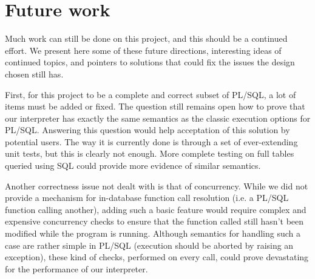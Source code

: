 \documentclass[twoside,11pt,a4paper]{article}
\newcommand{\startsection}[1]{
	\cleardoublepage
	\section{#1}
	\thispagestyle{basic}
}
\begin{document}
%

\startsection{Future work}
\label{sec:futurework}


Much work can still be done on this project, and this should be a continued effort. We present here some of these future directions, interesting ideas of continued topics, and pointers to solutions that could fix the issues the design chosen still has.

First, for this project to be a complete and correct subset of PL/SQL, a lot of items must be added or fixed. The question still remains open how to prove that our interpreter has exactly the same semantics as the classic execution options for PL/SQL. Answering this question would help acceptation of this solution by potential users. The way it is currently done is through a set of ever-extending unit tests, but this is clearly not enough. More complete testing on full tables queried using SQL could provide more evidence of similar semantics.

Another correctness issue not dealt with is that of concurrency. While we did not provide a mechanism for in-database function call resolution (i.e. a PL/SQL function calling another), adding such a basic feature would require complex and expensive concurrency checks to ensure that the function called still hasn't been modified while the program is running. Although semantics for handling such a case are rather simple in PL/SQL (execution should be aborted by raising an exception), these kind of checks, performed on every call, could prove devastating for the performance of our interpreter.
\end{document}
